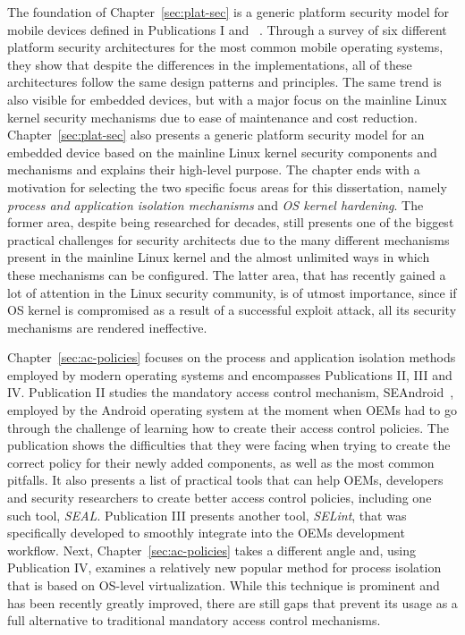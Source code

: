 The foundation of Chapter~\ref{sec:plat-sec} is a generic platform security model for mobile devices defined in Publications I and ~\cite{2013Asokan}. Through a survey of six different platform security architectures for the most common mobile operating systems, they show that despite the differences in the implementations, all of these architectures follow the same design patterns and principles. The same trend is also visible for embedded devices, but with a major focus on the mainline Linux kernel security mechanisms due to ease of maintenance and cost reduction. Chapter~\ref{sec:plat-sec} also presents a generic platform security model for an embedded device based on the mainline Linux kernel security components and mechanisms and explains their high-level purpose. The chapter ends with a motivation for selecting the two specific focus areas for this dissertation, namely \textit{process and application isolation mechanisms} and \textit{OS kernel hardening}. The former area, despite being researched for decades, still presents one of the biggest practical challenges
for security architects due to the many different mechanisms present in the mainline Linux kernel and the almost unlimited ways in which these mechanisms can be configured. The latter area, that has recently gained a lot of attention in the Linux security community, is of utmost importance, since if OS kernel is compromised as a result of a successful exploit attack, all its security mechanisms are rendered ineffective.

Chapter~\ref{sec:ac-policies} focuses on the process and application isolation methods employed by modern operating systems and encompasses Publications II, III and IV. Publication II studies the mandatory access control mechanism, SEAndroid~\cite{smalley12}, employed by the Android operating system at the moment when OEMs had to go through the challenge of learning how to create their access control policies. The publication shows the difficulties that they were facing when trying to create the correct policy for their newly added components, as well as the most common pitfalls. It also presents a list of practical tools that can help OEMs, developers and security researchers to create better access control policies, including one such tool, \textit{SEAL}. Publication III presents another tool, \textit{SELint}, that was specifically developed to smoothly integrate into the OEMs development workflow. Next, Chapter~\ref{sec:ac-policies} takes a different angle and, using Publication IV, examines a relatively new popular method for process isolation that is based on OS-level virtualization. While this technique is prominent and has been recently greatly improved, there are still gaps that prevent its usage as a full alternative to traditional mandatory access control mechanisms.

